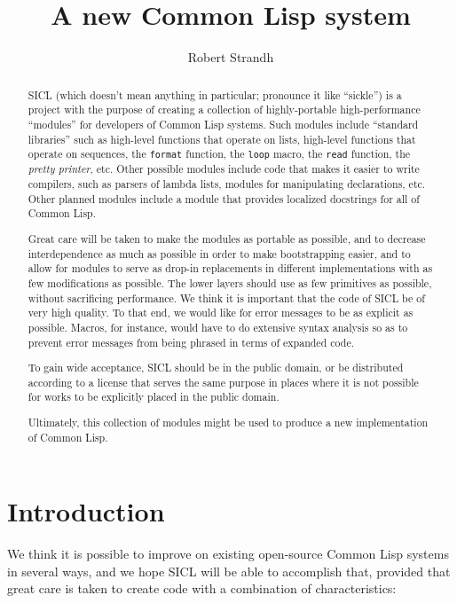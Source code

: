 \documentclass{article}
\title{{\Huge \sysname{}}\\
A new Common Lisp system}
\author{Robert Strandh}
\def\sysname{SICL}
\begin{document}
\maketitle

\begin{abstract}
\sysname{} (which doesn't mean anything in particular; pronounce it
like ``sickle'') is a project with the purpose of creating a
collection of highly-portable high-performance ``modules'' for
developers of Common Lisp systems.  Such modules include ``standard
libraries'' such as high-level functions that operate on lists,
high-level functions that operate on sequences, the \texttt{format}
function, the \texttt{loop} macro, the \texttt{read} function, the
\emph{pretty printer}, etc.  Other possible modules include code that
makes it easier to write compilers, such as parsers of lambda lists,
modules for manipulating declarations, etc.  Other planned modules
include a module that provides localized docstrings for all of Common
Lisp. 

Great care will be taken to make the modules as portable as possible,
and to decrease interdependence as much as possible in order to make
bootstrapping easier, and to allow for modules to serve as drop-in
replacements in different implementations with as few modifications as
possible.  The lower layers should use as few primitives as
possible, without sacrificing performance.  We think it is important
that the code of \sysname{} be of very high quality.  To that end, we
would like for error messages to be as explicit as possible.  Macros,
for instance, would have to do extensive syntax analysis so as to
prevent error messages from being phrased in terms of expanded code.

To gain wide acceptance, \sysname{} should be in the public domain, or
be distributed according to a license that serves the same purpose in
places where it is not possible for works to be explicitly placed in
the public domain.

Ultimately, this collection of modules might be used to produce a new
implementation of Common Lisp.  
\end{abstract}

\section{Introduction}

We think it is possible to improve on existing open-source Common Lisp
systems in several ways, and we hope \sysname{} will be able to
accomplish that, provided that great care is taken to create code with
a combination of characteristics:
\end{document}
